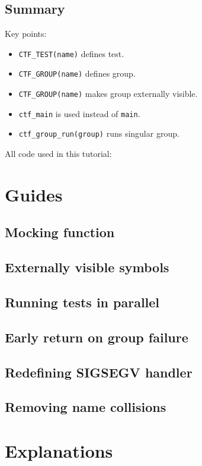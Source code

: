 \documentclass[12pt]{article}
\begin{document}
\subsection{Summary}
Key points:
\begin{itemize}
  \item \texttt{CTF\_TEST(name)} defines test.
  \item \texttt{CTF\_GROUP(name)} defines group.
  \item \texttt{CTF\_GROUP(name)} makes group externally visible.
  \item \texttt{ctf\_main} is used instead of \texttt{main}.
  \item \texttt{ctf\_group\_run(group)} runs singular group.
\end{itemize}
All code used in this tutorial:
\section{Guides}
\subsection{Mocking function}
\subsection{Externally visible symbols}
\subsection{Running tests in parallel}
\subsection{Early return on group failure}
\subsection{Redefining SIGSEGV handler}
\subsection{Removing name collisions}
\section{Explanations}
\end{document}
